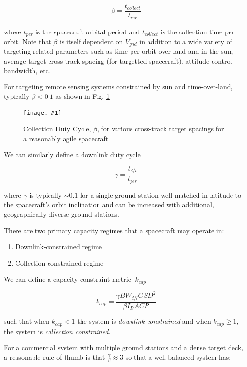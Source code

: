 \documentclass[10pt,journal]{IEEEtran}  %
\newcommand{\includefigure}[3]
{
  \begin{figure}[h!]
  \centering
  \texttt{[image: \#1]}
  \caption[]{#3}
  \label{#2}
  \end{figure}
}
\begin{document}
\begin{equation}
    \beta = \frac{t_{collect}}{t_{per}}
\end{equation} 

where $t_{per}$ is the spacecraft orbital period and $t_{collect}$ is the collection time per orbit.  Note that $\beta$ is itself dependent on $V_{gnd}$ in addition to a wide variety of targeting-related parameters such as time per orbit over land and in the sun, average target cross-track spacing (for targetted spacecraft), attitude control bandwidth, etc.

For targeting remote sensing systems constrained by sun and time-over-land, typically $\beta < 0.1$ as shown in Fig. \ref{fig:beta}

\includefigure{figures/collection_dc.pgf}{fig:beta}{Collection Duty Cycle, $\beta$, for various cross-track target spacings for a reasonably agile spacecraft}

We can similarly define a downlink duty cycle

\begin{equation}
    \gamma = \frac{t_{d/l}}{t_{per}}
\end{equation}

where $\gamma$ is typically $\sim 0.1$ for a single ground station well matched in latitude to the spacecraft's orbit inclination and can be increased with additional, geographically diverse ground stations.

There are two primary capacity regimes that a spacecraft may operate in:

\begin{enumerate}
\item Downlink-constrained regime
\item Collection-constrained regime
\end{enumerate}

We can define a capacity constraint metric, $k_{cap}$

\begin{equation}
k_{cap} = \frac{\gamma BW_{d/l} GSD^2}{\beta I_D ACR}
\end{equation}

such that when $k_{cap} < 1$ the system is \emph{downlink constrained} and when $k_{cap} \geq 1$, the system is \emph{collection constrained}.

For a commercial system with multiple ground stations and a dense target deck, a reasonable rule-of-thumb is that $\frac{\gamma}{\beta} \approx 3$ so that a well balanced system has:
\end{document}
